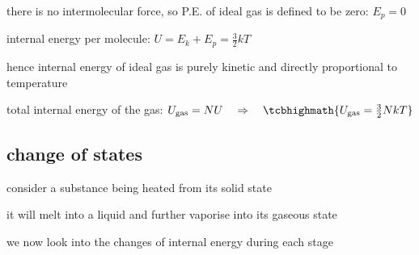 there is no intermolecular force, so P.E. of ideal gas is defined to be zero: $E_p = 0$

internal energy per molecule: $U = E_k + E_p = \frac{3}{2}kT$

hence internal energy of ideal gas is purely kinetic and directly proportional to temperature

total internal energy of the gas: $U_\text{gas} = NU \RA \tcbhighmath{U_\text{gas} = \frac{3}{2}NkT}$

\subsection{change of states}

consider a substance being heated from its solid state

it will melt into a liquid and further vaporise into its gaseous state

we now look into the changes of internal energy during each stage

\begin{figure}[ht]
\centering
{}
\end{figure}


